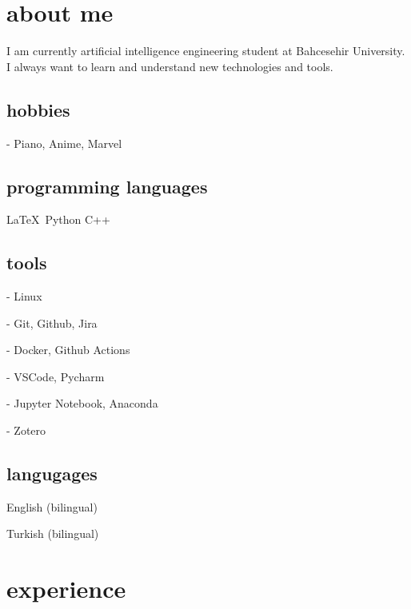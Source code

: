 \documentclass{resume-class} %
\begin{document}
\makeprofile




\section{about me}

I am currently artificial intelligence engineering student at Bahcesehir University. I always want to learn and understand new technologies and tools.

\subsection{hobbies}

- Piano, Anime, Marvel


\subsection{programming languages}

\LaTeX\ Python C++

\subsection{tools}
- Linux

- Git, Github, Jira

- Docker, Github Actions

- VSCode, Pycharm

- Jupyter Notebook, Anaconda

- Zotero

\subsection{langugages}

English (bilingual)

Turkish (bilingual)


\section{experience}
\blindtext
\end{document}
